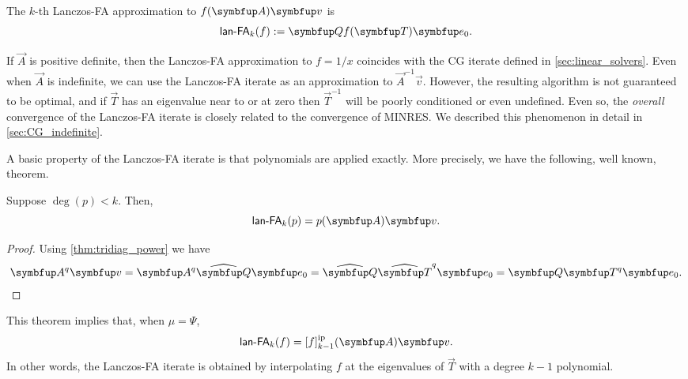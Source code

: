 \begin{definition}
    \label{def:lanczos_fa}
The \( k \)-th Lanczos-FA approximation to \( f\A\vec{v} \) is
\begin{equation*}
    \lan_k(f) 
    := \vec{Q} f\mf{\vec{T}} \vec{e}_0.
\end{equation*}
\end{definition}

\begin{remark}
\label{rem:CG_MINRES}
If \( \vec{A} \) is positive definite, then the Lanczos-FA approximation to \( f = 1/x \) coincides with the CG iterate defined in \cref{sec:linear_solvers}.
 Even when $\vec{A}$ is indefinite, we can use the Lanczos-FA iterate as an approximation to \( \vec{A}^{-1}\vec{v} \).
However, the resulting algorithm is not guaranteed to be optimal, and if $\vec{T}$ has an eigenvalue near to or at zero then $\vec{T}^{-1}$ will be poorly conditioned or even undefined. 
Even so, the \emph{overall} convergence of the Lanczos-FA iterate is closely related to the convergence of MINRES.
    We described this phenomenon in detail in \cref{sec:CG_indefinite}. \qedhere
\end{remark}


A basic property of the Lanczos-FA iterate is that polynomials are applied exactly. 
More precisely, we have the following, well known, theorem.
\begin{theorem}
    \label{thm:lanczosFA_exact}
    Suppose \( \deg(p) < k \). 
    Then,
    \begin{equation*}
        \lan_k(p) = \pA \vec{v}.
    \end{equation*}
\end{theorem}

\begin{proof}
    Using \cref{thm:tridiag_power} we have
    \begin{align*}
        \vec{A}^{q} \vec{v} = \vec{A}^q \Qhat \vec{e}_0
        = \Qhat \widehat{\vec{T}}^q \vec{e}_0
        = \vec{Q} \vec{T}^q \vec{e}_0.
    \end{align*}
\end{proof}


This theorem implies that, when \( \mu = \Psi \), 
\begin{equation*}
    \lan_k(f) = \ff[i]{f}{k-1}\mf{\vec{A}} \vec{v}.
\end{equation*}
In other words, the Lanczos-FA iterate is obtained by interpolating \( f \) at the eigenvalues of \( \vec{T} \) with a degree \( k-1 \) polynomial.



